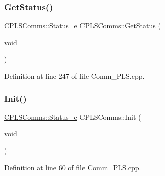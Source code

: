 \subsubsection{\texorpdfstring{Get\+Status()}{GetStatus()}}
{\footnotesize\ttfamily \mbox{\hyperlink{class_c_p_l_s_comms_a765bc36363f75f4faf4fd2b41d440159}{C\+P\+L\+S\+Comms\+::\+Status\+\_\+e}} C\+P\+L\+S\+Comms\+::\+Get\+Status (\begin{DoxyParamCaption}\item[{void}]{ }\end{DoxyParamCaption})}



Definition at line 247 of file Comm\+\_\+\+P\+L\+S.\+cpp.

\mbox{\label{class_c_p_l_s_comms_ae7f8d87ea15de35a120d65a7a8bbbb76}} 
\subsubsection{\texorpdfstring{Init()}{Init()}}
{\footnotesize\ttfamily \mbox{\hyperlink{class_c_p_l_s_comms_a765bc36363f75f4faf4fd2b41d440159}{C\+P\+L\+S\+Comms\+::\+Status\+\_\+e}} C\+P\+L\+S\+Comms\+::\+Init (\begin{DoxyParamCaption}\item[{void}]{ }\end{DoxyParamCaption})}



Definition at line 60 of file Comm\+\_\+\+P\+L\+S.\+cpp.


